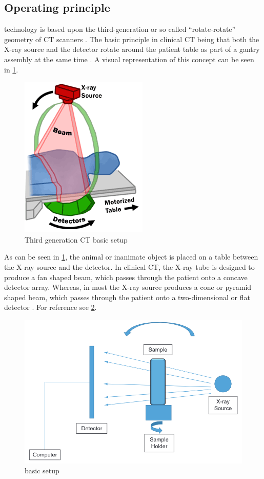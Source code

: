 \subsection{Operating principle}
\label{s:b-mct-operation}
\mct\space technology is based upon the third-generation or so called ``rotate-rotate'' geometry of CT scanners \cite{flohrCTSystems2013}.
The basic principle in clinical CT being that both the X-ray source and the detector rotate around the patient table as part of a gantry assembly at the same time \cite{flohrCTSystems2013}.
A visual representation of this concept can be seen in \cref{fig:3ct}.
\begin{figure}[h]
	\centerline{
		\includegraphics[scale=0.5]{images/ct.png}}
	\caption{Third generation CT basic setup \cite{fdaDrawingCTFan2019}}
	\label{fig:3ct}
\end{figure}

\noindent
As can be seen in \cref{fig:3ct}, the animal or inanimate object is placed on a table between the X-ray source and the detector.
In clinical CT, the X-ray tube is designed to produce a fan shaped beam, which passes through the patient onto a concave detector array.
Whereas, in most \mct\space the X-ray source produces a cone or pyramid shaped beam, which passes through the patient onto a two-dimensional or flat detector \cite{babaComparisonFlatpanelDetector2002,clarkAdvancesMicroCTImaging2021}.
For reference see \cref{fig:mct}.
\begin{figure}[h]
	\centerline{
		\includegraphics[scale=0.5]{images/mct.png}}
	\caption{\mct\space basic setup\cite{orhanMicrocomputedTomographyMicroCT2020}}
	\label{fig:mct}
\end{figure}

